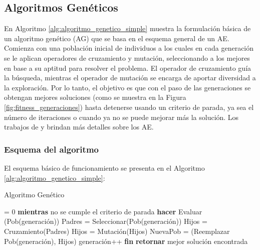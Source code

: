 \subsection{Algoritmos Genéticos}
En Algoritmo \ref{alg:algoritmo_genetico_simple} muestra la formulación básica de un algoritmo genético (AG) que se basa en el esquema general de un AE. Comienza con una población inicial de individuos a los cuales en cada generación se le aplican operadores de cruzamiento y mutación, seleccionando a los mejores en base a su aptitud para resolver el problema. El operador de cruzamiento guía la búsqueda, mientras el operador de mutación se encarga de aportar diversidad a la exploración. Por lo tanto, el objetivo es que con el paso de las generaciones se obtengan mejores soluciones (como se muestra en la Figura \ref{fig:fitness_generaciones}) hasta detenerse usando un criterio de parada, ya sea el número de iteraciones o cuando ya no se puede mejorar más la solución. Los trabajos de \citet{Goldberg1989} y \citet{Mitchell1996} brindan más detalles sobre los AE.

\subsubsection{Esquema del algoritmo}

El esquema básico de funcionamiento se presenta en el Algoritmo \ref{alg:algoritmo_genetico_simple}:


\begin{algorithm}[ht]
	\caption{Algoritmo Genético}
	\label{alg:algoritmo_genetico_simple}
	\begin{algorithmic} [1] 
		{
			 = 0
			\STATE \textbf{mientras} {no se cumple el criterio de parada} \textbf{hacer}
			\STATE\hspace{\algorithmicindent} {Evaluar (Pob(generación))}
			\STATE\hspace{\algorithmicindent} {Padres = Seleccionar(Pob(generación))}
			\STATE\hspace{\algorithmicindent} {Hijos = Cruzamiento(Padres)}
			\STATE\hspace{\algorithmicindent} {Hijos = Mutación(Hijos)}
			\STATE\hspace{\algorithmicindent} {NuevaPob = (Reemplazar Pob(generación), Hijos)}
			\STATE\hspace{\algorithmicindent} {generación}++
			\STATE \textbf{fin}
			\STATE \textbf{retornar} mejor solución encontrada
		}
	\end{algorithmic}
\end{algorithm}


